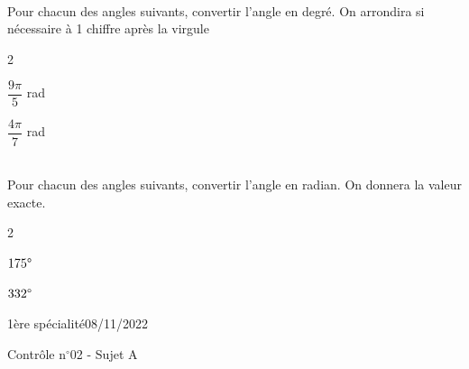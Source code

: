 \documentclass[a4paper,11pt]{article}        %
\begin{document}
\\
Pour chacun des angles suivants, convertir l'angle en degré. On arrondira si nécessaire à 1 chiffre après la virgule
\begin{multicols}{2}
\begin{enumMet}
    \item $\dfrac{9\pi}{5}$ rad \quad {}
    \item $\dfrac{4\pi}{7}$ rad  \quad {}
\end{enumMet}
\end{multicols}

\\
Pour chacun des angles suivants, convertir l'angle en radian. On donnera la valeur exacte.
\begin{multicols}{2}
\begin{enumMet}
    \item $175\degree$ \quad {}
    \item $332\degree$ \quad {}
\end{enumMet}
\end{multicols}

\newpage

\vspace*{-1.5cm}
1ère spécialité\phantom{xxxxxxxxxxxxxxxxxxxxxxxxxxxxxxxxxxxxxxxxxxxxxxxxxxxxxxxxxxxxxxx}08/11/2022
{\begin{center}\Huge{Contrôle n$^{\circ}$02 - Sujet A}\end{center}}

\end{document}
